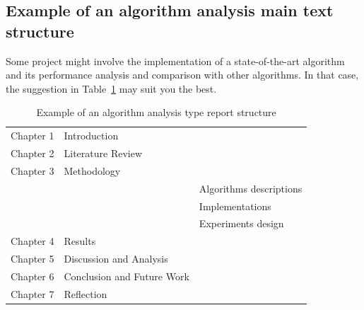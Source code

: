 \subsection{Example of an algorithm analysis main text structure}
Some project might involve the implementation of a state-of-the-art algorithm and its performance analysis and comparison with other algorithms. In that case, the suggestion in Table~\ref{tab:algo_temp} may suit you the best. 
\begin{table}[!ht]
    \centering
    \caption{Example of an algorithm analysis type report structure}
    \label{tab:algo_temp}
    \begin{tabular}{lll}     
        \toprule                   
        Chapter 1 & Introduction  &    \\        
        Chapter 2 & Literature Review  &    \\                
        Chapter 3 & Methodology   &    \\
        &               & Algorithms descriptions  \\
        &               & Implementations   \\
        &               & Experiments design   \\
        Chapter 4 & Results       &  \\
        Chapter 5 & Discussion and Analysis  &    \\
        Chapter 6 & Conclusion and Future Work  &    \\        
        Chapter 7 & Reflection  &    \\          
        \bottomrule
    \end{tabular}
\end{table}

